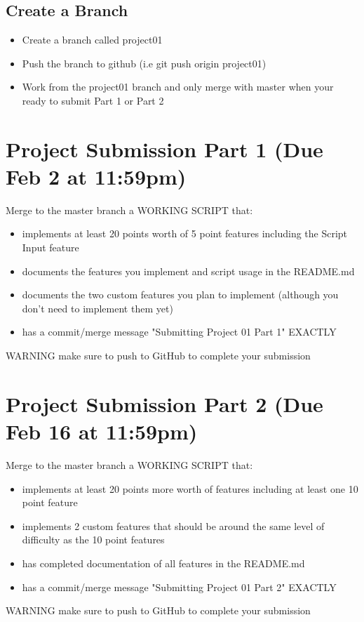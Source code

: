 \documentclass[11pt]{article}
\begin{document}
\subsection{Create a Branch}
\label{sec:orgc974042}
\begin{itemize}
\item Create a branch called {\color{purple}project01}
\item Push the branch to github (i.e {\color{purple}git push origin project01})
\item Work from the {\color{purple}project01} branch and {\color{red}only merge with master when your ready to submit Part 1 or Part 2}
\end{itemize}

\newpage

\section{Project Submission Part 1 (Due Feb 2 at 11:59pm)}
\label{sec:orgf82793b}
Merge to the master branch a {\color{purple}WORKING SCRIPT} that:
\begin{itemize}
\item implements at least {\color{purple}20 points} worth of {\color{purple}5 point} features including the
{\color{purple}Script Input} feature
\item documents the features you implement and script usage in the {\color{purple}README.md}
\item documents the {\color{purple}two custom features} you plan to implement (although you
don't need to implement them yet)
\item has a commit/merge message {\color{olive}"Submitting Project 01 Part 1"} {\color{purple}EXACTLY}
\end{itemize}
{\color{red}WARNING} make sure to push to GitHub to complete your submission 

\section{Project Submission Part 2 (Due Feb 16 at 11:59pm)}
\label{sec:orgb48419c}
Merge to the master branch a {\color{purple}WORKING SCRIPT} that:
\begin{itemize}
\item implements at least {\color{purple}20 points} more worth of features
including {\color{purple}at least one 10 point feature}
\item implements {\color{purple}2 custom features} that should be around the same level of
difficulty as the {\color{purple}10 point features}
\item has completed documentation of all features in the {\color{purple}README.md}
\item has a commit/merge message {\color{olive}"Submitting Project 01 Part 2"} {\color{purple}EXACTLY}
\end{itemize}
{\color{red}WARNING} make sure to push to GitHub to complete your submission
\end{document}
